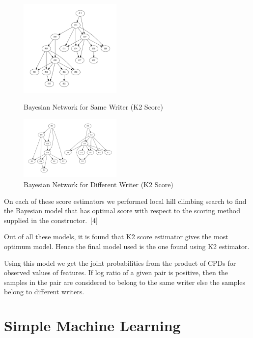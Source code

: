 \documentclass{article}
\begin{document}
    \begin{figure}[h]
  \begin{minipage}{0.48\textwidth}
  \centering
  \includegraphics[width=50mm,scale=0.5]{bayesian_yes_K2.jpg}
  \caption{Bayesian Network for Same Writer (K2 Score)}
  \end{minipage}\hfill\hfill\hfill
  \begin{minipage}{0.48\textwidth}
  \centering
  \includegraphics[width=50mm,scale=0.5]{bayesian_no_K2.jpg}
  \caption{Bayesian Network for Different Writer (K2 Score)}
  \end{minipage}
\end{figure}

    
    
    On each of these score estimators we performed local hill climbing search to find the Bayesian model that has optimal score with respect to the scoring method supplied in the constructor.\ [4]
    
    Out of all these models, it is found that K2 score estimator gives the most optimum model. Hence the final model used is the one found using K2 estimator.
    
    Using this model we get the joint probabilities from the product of CPDs for observed values of features. If log ratio of a given pair is positive, then the samples in the pair are considered to belong to the same writer else the samples belong to different writers.

\section{Simple Machine Learning}
\end{document}
